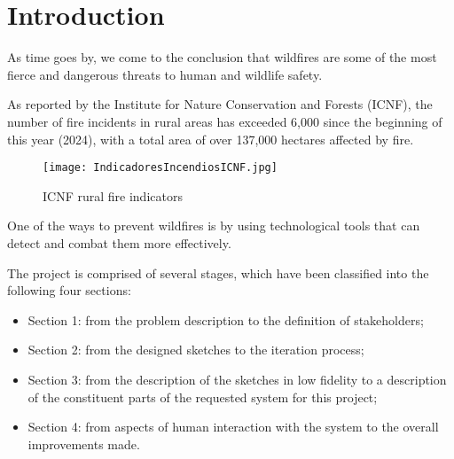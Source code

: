 \chapter*{Introduction} \label{intro}
As time goes by, we come to the conclusion that wildfires are 
some of the most fierce and dangerous threats to human and 
wildlife safety. \par
As reported by the Institute for Nature Conservation and Forests (ICNF), the
number of fire incidents in rural areas has exceeded 6,000 since the beginning of
this year (2024), with a total area of over 137,000 hectares affected by fire. \par 
\begin{figure}[H] 
\centering
\texttt{[image: IndicadoresIncendiosICNF.jpg]}
\caption{ICNF rural fire indicators}
\end{figure}
One of the ways to prevent wildfires is by using 
technological tools that can detect and combat them more 
effectively. \par 
The project is comprised of several stages, which have been classified into 
the following four
sections: 
\begin{itemize}
    \item Section 1: from the problem description to the 
    definition of stakeholders;
    \item Section 2: from the designed sketches to the iteration 
    process; 
    \item Section 3: from the description of the sketches in 
    low fidelity to a description
    of the constituent parts of the requested system for this project;
    \item Section 4: from aspects of human interaction with the system to the overall
    improvements made.
\end{itemize}


